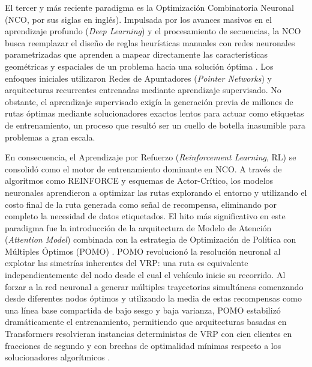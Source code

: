 \documentclass[12pt]{report}
\begin{document}
El tercer y m\'as reciente paradigma es la Optimizaci\'on Combinatoria Neuronal (NCO, por sus siglas en ingl\'es). Impulsada por los avances masivos en el aprendizaje profundo (\textit{Deep Learning}) y el procesamiento de secuencias, la NCO busca reemplazar el dise\~no de reglas heur\'isticas manuales con redes neuronales parametrizadas que aprenden a mapear directamente las caracter\'isticas geom\'etricas y espaciales de un problema hacia una soluci\'on \'optima \cite{Kwon2020POMO}. Los enfoques iniciales utilizaron Redes de Apuntadores (\textit{Pointer Networks}) y arquitecturas recurrentes entrenadas mediante aprendizaje supervisado. No obstante, el aprendizaje supervisado exig\'ia la generaci\'on previa de millones de rutas \'optimas mediante solucionadores exactos lentos para actuar como etiquetas de entrenamiento, un proceso que result\'o ser un cuello de botella inasumible para problemas a gran escala.

En consecuencia, el Aprendizaje por Refuerzo (\textit{Reinforcement Learning}, RL) se consolid\'o como el motor de entrenamiento dominante en NCO. A trav\'es de algoritmos como REINFORCE y esquemas de Actor-Cr\'itico, los modelos neuronales aprendieron a optimizar las rutas explorando el entorno y utilizando el costo final de la ruta generada como se\~nal de recompensa, eliminando por completo la necesidad de datos etiquetados. El hito m\'as significativo en este paradigma fue la introducci\'on de la arquitectura de Modelo de Atenci\'on (\textit{Attention Model}) combinada con la estrategia de Optimizaci\'on de Pol\'itica con M\'ultiples \'Optimos (POMO) \cite{Kool2019Attention, Kwon2020POMO}. POMO revolucion\'o la resoluci\'on neuronal al explotar las simetr\'ias inherentes del VRP: una ruta es equivalente independientemente del nodo desde el cual el veh\'iculo inicie su recorrido. Al forzar a la red neuronal a generar m\'ultiples trayectorias simult\'aneas comenzando desde diferentes nodos \'optimos y utilizando la media de estas recompensas como una l\'inea base compartida de bajo sesgo y baja varianza, POMO estabiliz\'o dram\'aticamente el entrenamiento, permitiendo que arquitecturas basadas en Transformers resolvieran instancias deterministas de VRP con cien clientes en fracciones de segundo y con brechas de optimalidad m\'inimas respecto a los solucionadores algor\'itmicos \cite{Kwon2020POMO, Berto2023RL4CO}.
\end{document}
